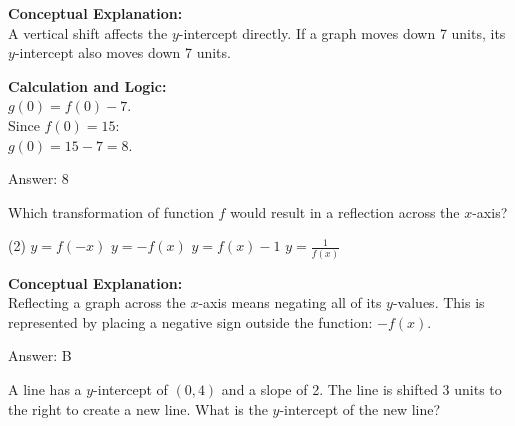 \documentclass[11pt,paper=a4,answers]{exam}
\begin{document}
\begin{questions}
\begin{solution}
\textbf{Conceptual Explanation:} \\
A vertical shift affects the $y$-intercept directly. If a graph moves down 7 units, its $y$-intercept also moves down 7 units.

\vspace{20pt}

\textbf{Calculation and Logic:} \\
$g(0) = f(0) - 7$. \\
Since $f(0) = 15$: \\
$g(0) = 15 - 7 = 8$.

\vspace{25pt}

Answer: \colorbox{yellow!100}{8}
\end{solution}

\vspace{40pt}

\question
\begin{center}
\end{center}
Which transformation of function $f$ would result in a reflection across the $x$-axis?
\begin{tasks}(2)
    \task $y = f(-x)$
    \task $y = -f(x)$
    \task $y = f(x) - 1$
    \task $y = \frac{1}{f(x)}$
\end{tasks}

\begin{solution}
\textbf{Conceptual Explanation:} \\
Reflecting a graph across the $x$-axis means negating all of its $y$-values. This is represented by placing a negative sign outside the function: $-f(x)$.

\vspace{25pt}

Answer: \colorbox{yellow!100}{B}
\end{solution}

\vspace{40pt}

\question
A line has a $y$-intercept of $(0, 4)$ and a slope of 2. The line is shifted 3 units to the right to create a new line. What is the $y$-intercept of the new line?


\end{questions}
\end{document}
